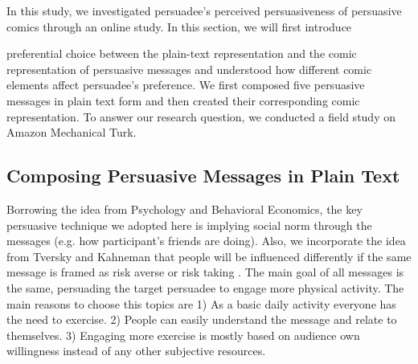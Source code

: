 In this study, we investigated persuadee's perceived persuasiveness of persuasive comics through an online study. In this section, we will first introduce

preferential choice between the plain-text representation and the comic representation of persuasive messages and understood how different comic elements affect persuadee's preference. We first composed five persuasive messages in plain text form and then created their corresponding comic representation. To answer our research question, we conducted a field study on Amazon Mechanical Turk.

\subsection{Composing Persuasive Messages in Plain Text}
Borrowing the idea from Psychology and Behavioral Economics, the key persuasive technique we adopted here is implying social norm through the messages (e.g. how participant's friends are doing). Also, we incorporate the idea from Tversky and Kahneman that people will be influenced differently if the same message is framed as risk averse or risk taking \cite{tversky1981framing}. The main goal of all messages is the same, persuading the target persuadee to engage more physical activity. The main reasons to choose this topics are 1) As a basic daily activity everyone has the need to exercise. 2) People can easily understand the message and relate to themselves. 3) Engaging more exercise is mostly based on audience own willingness instead of any other subjective resources.\par

